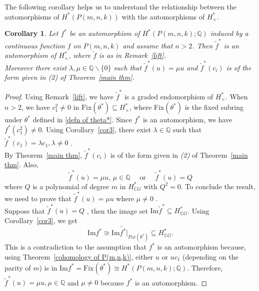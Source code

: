 \documentclass{amsart}
\newtheorem{corollary}[theorem]{Corollary}
\newcommand{\thmref}[1]{Theorem~\ref{#1}}
\newcommand{\corref}[1]{Corollary~\ref{#1}}
\newcommand{\remref}[1]{Remark~\ref{#1}}
\newcommand{\im}{\mathrm{Im}}
\newcommand{\fix}{\mathrm{Fix}}
\begin{document}
	The following corollary helps %
us to understand the relationship between the automorphisms of $H^*(P(m,n,k))$ with the automorphisms of $H^*_{\times}$.
	\begin{corollary}\label{automor}
		Let $f^*$ be an automorphism of $H^*(P(m,n,k);\mathbb{Q})$ induced by a continuous function $f$ on $P(m,n,k)$ and assume that $n> 2$. Then $\tilde{f}^*$ is an automorphism of $H^*_{\times}$, where $\tilde{f}$ is as in \remref{lift}. \\ Moreover there exist $\lambda, \mu \in \mathbb{Q}\backslash \{0\}$ such that $\tilde{f}^*(u) = \mu u$ and $\tilde{f}^*(c_i)$ is of the form given in \textit{(2)} of \thmref{main thm}.
	\end{corollary}
	\begin{proof}
		Using \remref{lift}, we have $\tilde{f}^*$ is a graded endomorphism of $H^*_{\times}$. When $n>2$, we have $c_1^2\neq 0$ in $\fix (\theta^*)\subseteq H^*_\times$, where Fix$(\theta^*)$ is the fixed subring under $\theta^*$ defined in \eqref{defn of theta*}. Since $f^*$ is an automorphism, we have $f^*(c_1^2) \neq 0$. Using \corref{cor3}, there exist $\lambda \in \mathbb{Q}$ such that $\tilde{f}^*(c_1) = \lambda c_1, \lambda \neq 0$%
.\\
		By \thmref{main thm}, $\tilde{f}^*(c_i)$ %
is of the form given in \textit{(2)} of \thmref{main thm}. %
Also, $$\tilde{f}^*(u) = \mu u, \, \mu \in \mathbb{Q} \quad \text{ or } \quad \tilde{f}^*(u) = Q$$ where %
$Q$ is a polynomial of degree $m$ in $H^*_{\mathbb{C}G}$ with $Q^2 =0$. To conclude the result, we need to prove that $\tilde{f}^*(u) = \mu u$ where $\mu \neq 0$%
. \\
		Suppose that $\tilde{f}^*(u) = Q$%
, then the image set $\im \tilde{f}^*\subseteq H^*_{\mathbb{C}G}$. Using \corref{cor3}, we get $$\im f^*  \cong \im \tilde{f^*}|_{Fix (\theta^*)}\subseteq H^*_{\mathbb{C}G}.$$ This is a contradiction to the assumption that $f^*$ is an %
automorphism because, using %
\thmref{cohomology of P(m,n,k)}, either $u$ or $uc_{1}$ (depending on the parity of $m$) is in $\im f^*=\fix (\theta^*) \cong H^*(P(m,n,k);\mathbb{Q})$. Therefore, $\tilde{f}^*(u) = \mu u, \mu \in \mathbb{Q}$ and $\mu \neq 0$ because $f^*$ is an %
automorphism.
	\end{proof}
\end{document}
